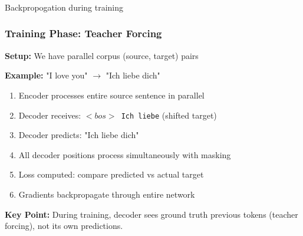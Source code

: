 		



			
			
		



			
			


\begin{frame}[fragile]\frametitle{}
\begin{center}
{\Large Backpropogation during training}
\end{center}
\end{frame}

\begin{frame}[fragile]\frametitle{Training Phase: Teacher Forcing}

\textbf{Setup:} We have parallel corpus (source, target) pairs

\textbf{Example:} "I love you" $\rightarrow$ "Ich liebe dich"

\begin{enumerate}
\item Encoder processes entire source sentence in parallel
\item Decoder receives: \texttt{$<bos>$ Ich liebe} (shifted target)
\item Decoder predicts: "Ich liebe dich"
\item All decoder positions process simultaneously with masking
\item Loss computed: compare predicted vs actual target
\item Gradients backpropagate through entire network
\end{enumerate}

\textbf{Key Point:} During training, decoder sees ground truth previous tokens (teacher forcing), not its own predictions.
\end{frame}

